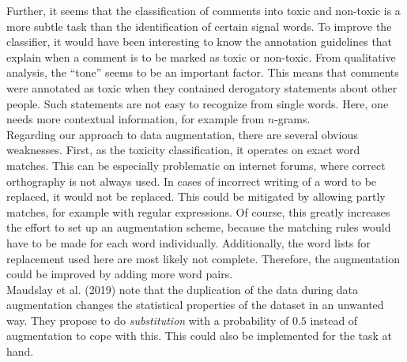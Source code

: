 \documentclass[11pt,a4paper]{article}
\begin{document}
Further, it seems that the classification of comments into toxic and non-toxic is a more subtle task than the identification of certain signal words. To improve the classifier, it would have been interesting to know the annotation guidelines that explain when a comment is to be marked as toxic or non-toxic. From qualitative analysis, the ``tone'' seems to be an important factor. This means that comments were annotated as toxic when they contained derogatory statements about other people. Such statements are not easy to recognize from single words. Here, one needs more contextual information, for example from $n$-grams. \\

Regarding our approach to data augmentation, there are several obvious weaknesses. First, as the toxicity classification, it operates on exact word matches. This can be especially problematic on internet forums, where correct orthography is not always used. In cases of incorrect writing of a word to be replaced, it would not be replaced. This could be mitigated by allowing partly matches, for example with regular expressions. Of course, this greatly increases the effort to set up an augmentation scheme, because the matching rules would have to be made for each word individually. Additionally, the word lists for replacement used here are most likely not complete. Therefore, the augmentation could be improved by adding more word pairs. \\
Maudslay et al. (2019) note that the duplication of the data during data augmentation changes the statistical properties of the dataset in an unwanted way. They propose to do \textit{substitution} with a probability of $0.5$ instead of augmentation to cope with this. This could also be implemented for the task at hand.


\end{document}
